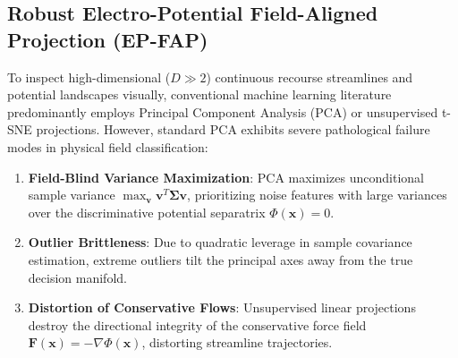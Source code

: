 \documentclass[preprint,review,12pt]{elsarticle}
\begin{document}
\subsection{Robust Electro-Potential Field-Aligned Projection (EP-FAP)}
To inspect high-dimensional ($D \gg 2$) continuous recourse streamlines and potential landscapes visually, conventional machine learning literature predominantly employs Principal Component Analysis (PCA) or unsupervised t-SNE projections. However, standard PCA exhibits severe pathological failure modes in physical field classification:
\begin{enumerate}
    \item \textbf{Field-Blind Variance Maximization}: PCA maximizes unconditional sample variance $\max_{\mathbf{v}} \mathbf{v}^T \boldsymbol{\Sigma} \mathbf{v}$, prioritizing noise features with large variances over the discriminative potential separatrix $\Phi(\mathbf{x}) = 0$.
    \item \textbf{Outlier Brittleness}: Due to quadratic leverage in sample covariance estimation, extreme outliers tilt the principal axes away from the true decision manifold.
    \item \textbf{Distortion of Conservative Flows}: Unsupervised linear projections destroy the directional integrity of the conservative force field $\mathbf{F}(\mathbf{x}) = -\nabla \Phi(\mathbf{x})$, distorting streamline trajectories.
\end{enumerate}
\end{document}
